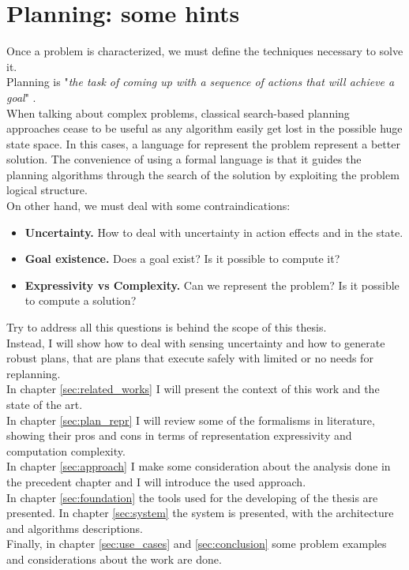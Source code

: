 \documentclass[pdftex,12pt,a4paper]{report}
\begin{document}
\section{Planning: some hints}
Once a problem is characterized, we must define the techniques necessary to solve it.\\
Planning is "\textit{the task of coming up with a sequence of actions that will achieve a goal}" \cite{russell2005ai}.\\
When talking about complex problems, classical search-based planning approaches cease to be useful as any algorithm easily get lost in the possible huge state space.
In this cases, a language for represent the problem represent a better solution.
The convenience of using a formal language is that it guides the planning algorithms through the search of the solution by exploiting the problem logical structure. \\
On other hand, we must deal with some contraindications:
\begin{itemize}
\item \textbf{Uncertainty.} How to deal with uncertainty in action effects and in the state.
\item \textbf{Goal existence.} Does a goal exist? Is it possible to compute it?
\item \textbf{Expressivity vs Complexity.} Can we represent the problem? Is it possible to compute a solution?
\end{itemize} 

\noindent Try to address all this questions is behind the scope of this thesis.\\ 
Instead, I will show how to deal with sensing uncertainty
and how to generate robust plans, that are plans that execute safely with limited or no needs for replanning.\\
\newline
\noindent In chapter \ref{sec:related_works} I will present the context of this work and the state of the art.\\ 
In chapter \ref{sec:plan_repr} I will review some of the formalisms in literature, showing their pros and cons in terms of representation expressivity and computation complexity.\\ 
In chapter \ref{sec:approach} I make some consideration about the analysis done in the precedent chapter and I will introduce the used approach.\\ 
In chapter \ref{sec:foundation} the tools used for the developing of the thesis are presented. In chapter \ref{sec:system} the system is presented, with the architecture and algorithms descriptions.\\ 
Finally, in chapter \ref{sec:use_cases} and \ref{sec:conclusion} some problem examples and considerations about the work are done.
\end{document}
